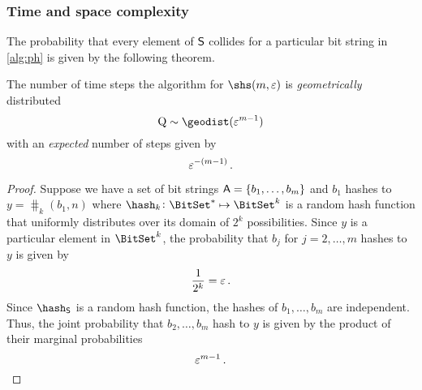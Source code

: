 \documentclass[ ../main.tex]{subfiles}
\begin{document}
\subsubsection{Time and space complexity}
The probability that every element of $\Set{S}$ collides for a particular bit string in \cref{alg:ph} is given by the following theorem.
\begin{theorem}
    The number of time steps the algorithm for $\shs(m,\fprate)$ is \emph{geometrically} distributed
    \begin{equation}
        \RV{Q} \sim \geodist(\fprate^{m-1})
    \end{equation}
    with an \emph{expected} number of steps given by
    \begin{equation}
        \label{eq:p_m_N}
        \varepsilon^{-(m-1)}\,.
    \end{equation}
\end{theorem}
\begin{proof}
    Suppose we have a set of bit strings $\Set{A} = \{b_1,\ldots,b_m\}$ and $b_1$ hashes to $y = \hash_k(b_1,n)$ where $\hash_k \colon \BitSet^{*} \mapsto \BitSet^k$ is a random hash function that uniformly distributes over its domain of $2^k$ possibilities.
    Since $y$ is a particular element in $\BitSet^k$, the probability that $b_j$ for $j=2,\ldots,m$ hashes to $y$ is given by
    \begin{equation}
        \frac{1}{2^k} = \varepsilon\,.
    \end{equation}
    Since $\hash_{\Set{S}}$ is a random hash function, the hashes of $b_1,\ldots,b_m$ are independent.
    Thus, the joint probability that $b_2, \ldots, b_m$ hash to $y$ is given by the product of their marginal probabilities
    \begin{equation}
        \varepsilon^{m-1}\,.
    \end{equation}
\end{proof}
\end{document}
